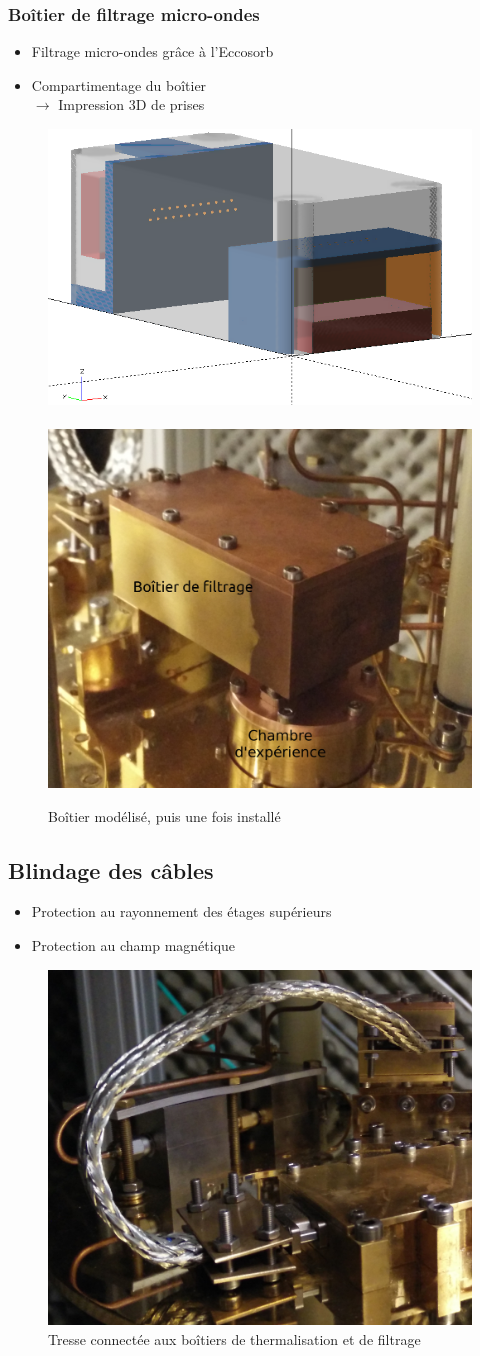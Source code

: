 \documentclass[8pt,a9paper]{beamer} \usepackage[utf8]{inputenc} \usepackage[francais]{babel} \usepackage[T1]{fontenc}
\begin{document}
\begin{frame}
\frametitle{Boîtier de filtrage micro-ondes}

\begin{itemize}
    \item Filtrage micro-ondes grâce à l'Eccosorb
    \vspace*{2mm}
    \item Compartimentage du boîtier\\
    \hspace*{1cm} $\rightarrow$ Impression 3D de prises
\end{itemize}

\begin{figure}[h]
    \centering
    \includegraphics[height=0.25\textwidth]{Images/Thermalisation/Filtrage3D}
    ~ 
    \includegraphics[height=0.25\textwidth]{Images/Thermalisation/Filtrage}
    \caption{Boîtier modélisé, puis une fois installé}
\end{figure}
\end{frame}

\subsection{Blindage des câbles}

\begin{frame}
\begin{itemize}
    \item Protection au rayonnement des étages supérieurs
    \vspace*{2mm}
    \item Protection au champ magnétique\\
\end{itemize}

\begin{figure}[h]
    \centering
    \includegraphics[height=0.35\textwidth]{Images/Tresse}
    \caption{Tresse connectée aux boîtiers de thermalisation et de filtrage}
\end{figure}
\end{frame}
\end{document}
